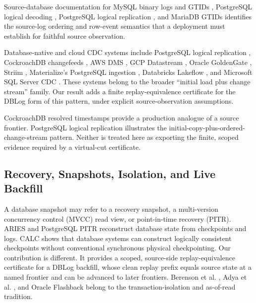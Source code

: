 \documentclass[letterpaper,10pt,twocolumn]{article}
\begin{document}
Source-database documentation for MySQL binary logs and GTIDs
\citep{mysql_binlog}, PostgreSQL logical decoding
\citep{postgres_logical_decoding}, PostgreSQL logical replication
\citep{postgres_logical_replication}, and MariaDB GTIDs
\citep{mariadb_binlog} identifies the source-log ordering and row-event
semantics that a deployment must establish for faithful source
observation.

Database-native and cloud CDC systems include PostgreSQL logical replication
\citep{postgres_logical_replication}, CockroachDB changefeeds
\citep{cockroachdb_changefeeds}, AWS DMS \citep{aws_dms}, GCP Datastream
\citep{gcp_datastream}, Oracle GoldenGate \citep{oracle_goldengate},
Striim \citep{striim}, Materialize's PostgreSQL ingestion
\citep{materialize_postgres}, Databricks Lakeflow
\citep{databricks_lakeflow}, and Microsoft SQL Server CDC
\citep{microsoft_sqlserver_cdc}. These systems belong to the broader
``initial load plus change stream'' family. Our result adds a finite
replay-equivalence certificate for the DBLog form of this pattern,
under explicit source-observation assumptions.

CockroachDB resolved timestamps provide a production analogue of a
source frontier. PostgreSQL logical replication illustrates the
initial-copy-plus-ordered-change-stream pattern. Neither is treated here
as exporting the finite, scoped evidence required by a virtual-cut
certificate.

\subsection{Recovery, Snapshots, Isolation, and Live
Backfill}\label{recovery-snapshots-isolation-and-live-backfill}

A database snapshot may refer to a recovery snapshot, a multi-version
concurrency control (MVCC) read view, or point-in-time recovery (PITR).
ARIES \citep{mohan1992aries} and PostgreSQL PITR
\citep{postgres_pitr} reconstruct database state from checkpoints and
logs. CALC \citep{ren2016calc} shows that database systems can construct
logically consistent checkpoints without conventional synchronous
physical checkpointing. Our contribution is different. It provides a
scoped, source-side replay-equivalence certificate for a DBLog backfill,
whose clean replay prefix equals source state at a named frontier and
can be advanced to later frontiers. Berenson et al.
\citep{berenson1995isolation}, Adya et al. \citep{adya2000isolation},
and Oracle Flashback \citep{oracle_flashback} belong to the
transaction-isolation and as-of-read tradition.
\end{document}
